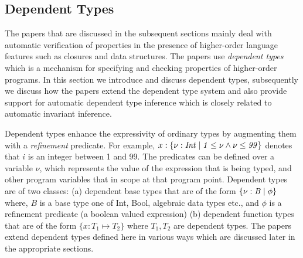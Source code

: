 \newcommand{\dt}[2]{\mathit{\{ #1 \vbar #2\}}}
\newcommand{\subtype}{\mathit{<:}}
\newcommand{\sem}[1]{\sembrack{#1}}

\subsection{Dependent Types}

The papers that are discussed in the subsequent sections mainly deal with 
automatic verification of properties in the presence of higher-order language features such as closures and data structures.
The papers use \emph{dependent types} which is a mechanism for specifying and checking properties of higher-order programs. In this section we introduce and discuss dependent types, subsequently we discuss how the papers extend the dependent type system and also provide support for automatic dependent type inference which is closely related to automatic invariant inference.

Dependent types enhance the expressivity of ordinary types by augmenting them with a \emph{refinement} predicate. For example, $x:\dt{\nu: Int}{1 \le \nu \wedge \nu \le 99}$ denotes that $i$ is an integer between 1 and 99. The predicates can be defined over a variable $\nu$, which represents the value of the expression that is being typed, and other program variables that in scope at that program point.
Dependent types are of two classes: (a) dependent base types that are of the form $\dt{\nu:B}{\phi}$ where, $B$ is a base type one of Int, Bool, algebraic data types etc., and $\phi$ is a refinement predicate (a boolean valued expression)
(b) dependent function types that are of the form $\{ x:T_1 \mapsto T_2\}$ 
where $T_1,T_2$ are dependent types.
The papers extend dependent types defined here in various ways which are discussed later in the appropriate sections.
 
